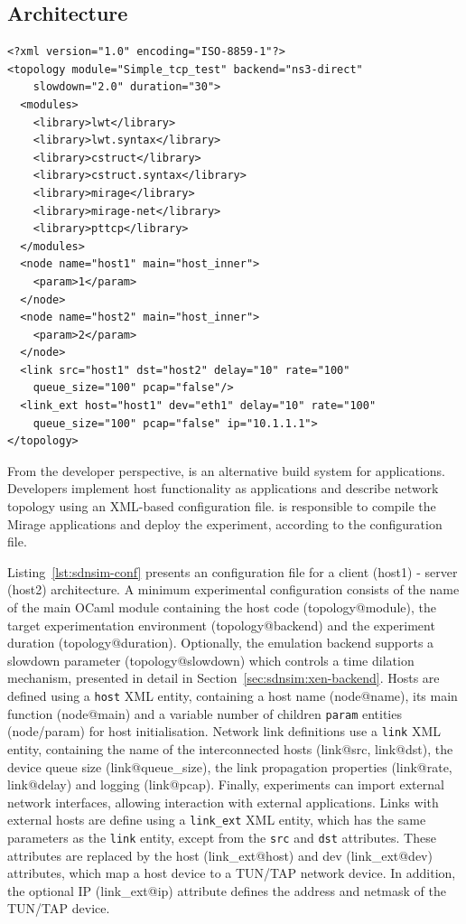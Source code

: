 \subsection{\sdnsim Architecture} \label{sec:sdnsim-design}

\lstset{language=XML,
numberstyle=\footnotesize,
basicstyle=\ttfamily\footnotesize,
captionpos=b,
}
\begin{lstlisting}[caption={A sample \sdnsim configuration file interconnecting
  a server and a client host},label={lst:sdnsim-conf}]
<?xml version="1.0" encoding="ISO-8859-1"?>
<topology module="Simple_tcp_test" backend="ns3-direct" 
    slowdown="2.0" duration="30">
  <modules>
    <library>lwt</library>
    <library>lwt.syntax</library>
    <library>cstruct</library>
    <library>cstruct.syntax</library>
    <library>mirage</library>
    <library>mirage-net</library>
    <library>pttcp</library>
  </modules>
  <node name="host1" main="host_inner"> 
    <param>1</param>
  </node>
  <node name="host2" main="host_inner"> 
    <param>2</param>
  </node>
  <link src="host1" dst="host2" delay="10" rate="100" 
    queue_size="100" pcap="false"/>
  <link_ext host="host1" dev="eth1" delay="10" rate="100" 
    queue_size="100" pcap="false" ip="10.1.1.1">
</topology>
\end{lstlisting}

From the developer perspective, \sdnsim is an alternative build system for
\mirage applications. Developers implement host functionality as \mirage
applications and describe network topology using an XML-based configuration
file. \sdnsim is responsible to compile the Mirage applications and deploy the
experiment, according to the configuration file. 

Listing~\ref{lst:sdnsim-conf} presents an \sdnsim configuration file for a
client (host1) - server (host2) architecture.  A minimum experimental
configuration consists of the name of the main OCaml module containing the host
code (topology@module), the target experimentation environment
(topology@backend) and the experiment duration (topology@duration).  Optionally,
the emulation backend supports a slowdown parameter (topology@slowdown) which
controls a time dilation mechanism, presented in detail in
Section~\ref{sec:sdnsim:xen-backend}.  Hosts are defined using a \texttt{host}
XML entity, containing a host name (node@name), its main function (node@main)
and a variable number of children \texttt{param} entities (node/param) for host
initialisation.  Network link definitions use a
\texttt{link} XML entity, containing the name of the interconnected hosts
(link@src, link@dst), the device queue size (link@queue\_size), the link
propagation properties (link@rate, link@delay) and logging 
(link@pcap).  Finally, experiments can import external network interfaces, 
allowing interaction with external applications.  Links with
external hosts are define using a \texttt{link\_ext} XML entity, which has the
same parameters as the \texttt{link} entity, except from the \texttt{src} and
\texttt{dst} attributes.  These attributes are replaced by the host
(link\_ext@host) and dev (link\_ext@dev) attributes, which map a host device to
a TUN/TAP network device. In addition, the optional IP (link\_ext@ip) attribute
defines the address and netmask of the TUN/TAP device. 

